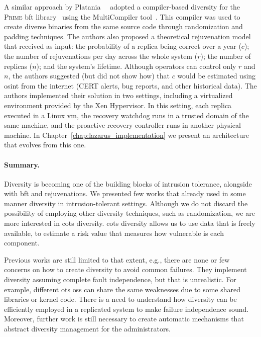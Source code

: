 A similar approach by Platania~\etal{}~\cite{Platania:2014} adopted a compiler-based diversity for the \textsc{Prime} \gls{bft} library~\cite{Amir:2011} using the MultiCompiler tool~\cite{Homescu:2013}.
This compiler was used to create diverse binaries from the same source code through randomization and padding techniques.
The authors also proposed a theoretical rejuvenation model that received as input: the probability of a replica being correct over a year ($c$); the number of rejuvenations per day across the whole system ($r$); the number of replicas ($n$); and the system's lifetime. 
Although operators can control only $r$ and $n$, the authors suggested (but did not show how) that $c$ would be estimated using \gls{osint} from the internet (CERT alerts, bug reports, and other historical data).
The authors implemented their solution in two settings, including a virtualized environment provided by the Xen Hypervisor.
In this setting, each replica executed in a Linux \gls{vm}, the recovery watchdog runs in a trusted domain of the same machine, and the proactive-recovery controller runs in another physical machine. In Chapter~\ref{chap:lazarus_implementation} we present an architecture that evolves from this one.


\paragraph{Summary.} 
Diversity is becoming one of the building blocks of intrusion tolerance, alongside with \gls{bft} and rejuvenations. 
We presented few works that already used in some manner diversity in intrusion-tolerant settings. 
Although we do not discard the possibility of employing other diversity techniques, such as randomization, we are more interested in \gls{cots} diversity.
\gls{cots} diversity allows us to use data that is freely available, to estimate a risk value that measures how vulnerable is each component. 

Previous works are still limited to that extent, e.g., there are none or few concerns on how to create diversity to avoid common failures. 
They implement diversity assuming complete fault independence, but that is unrealistic. 
For example, different \gls{ots} \glspl{os} can share the same weaknesses due to some shared libraries or kernel code. 
There is a need to understand how diversity can be efficiently employed in a replicated system to make failure independence sound. 
Moreover, further work is still necessary to create automatic mechanisms that abstract diversity management for the administrators.



